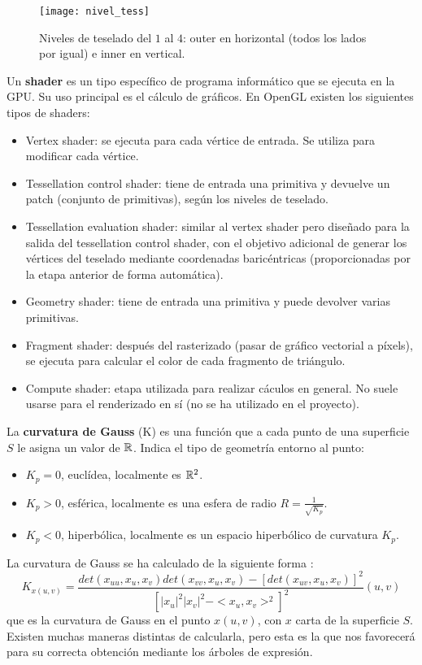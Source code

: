 \begin{figure}[h]
  	\centering
  	\texttt{[image: nivel\_tess]}
	\caption{Niveles de teselado del $1$ al $4$: outer en horizontal (todos los lados por igual) e inner en vertical.}
  	\label{fig:nivel_tess}
\end{figure}

\begin{definicion} Un \textbf{shader} es un tipo específico de programa informático que se ejecuta en la GPU. Su uso principal es el cálculo de gráficos. En OpenGL existen los siguientes tipos de shaders:
	\begin{itemize}
		\item Vertex shader: se ejecuta para cada vértice de entrada. Se utiliza para modificar cada vértice.
		\item Tessellation control shader: tiene de entrada una primitiva y devuelve un patch (conjunto de primitivas), según los niveles de teselado.
		\item Tessellation evaluation shader: similar al vertex shader pero diseñado para la salida del tessellation control shader, con el objetivo adicional de generar los vértices del teselado mediante coordenadas baricéntricas (proporcionadas por la etapa anterior de forma automática).
		\item Geometry shader: tiene de entrada una primitiva y puede devolver varias primitivas.
		\item Fragment shader: después del rasterizado (pasar de gráfico vectorial a píxels), se ejecuta para calcular el color de cada fragmento de triángulo.
		\item Compute shader: etapa utilizada para realizar cáculos en general. No suele usarse para el renderizado en sí (no se ha utilizado en el proyecto).
	\end{itemize}
\end{definicion}

\begin{definicion} La \textbf{curvatura de Gauss} (K) es una función que a cada punto de una superficie $S$ le asigna un valor de $\mathbb{R}$. Indica el tipo de geometría entorno al punto:
	\begin{itemize}
		\item $K_p = 0$, euclídea, localmente es $\mathbb{R}^2$.
		\item $K_p > 0$, esférica, localmente es una esfera de radio $R = \frac{1}{\sqrt{K_p}}$.
		\item $K_p < 0$, hiperbólica, localmente es un espacio hiperbólico de curvatura $K_p$.
	\end{itemize}
La curvatura de Gauss se ha calculado de la siguiente forma \cite{Wolfram}:
		$$K_{x(u,v)} = \frac{det(x_{uu}, x_u, x_v) det(x_{vv}, x_u, x_v) - [det(x_{uv}, x_u, x_v)]^2} {[|x_u|^2|x_v|^2 - <x_u, x_v>^2]^2} (u, v)$$
	que es la curvatura de Gauss en el punto $x(u, v)$, con $x$ carta de la superficie $S$. Existen muchas maneras distintas de calcularla, pero esta es la que nos favorecerá para su correcta obtención mediante los árboles de expresión.
\end{definicion}

\endinput
